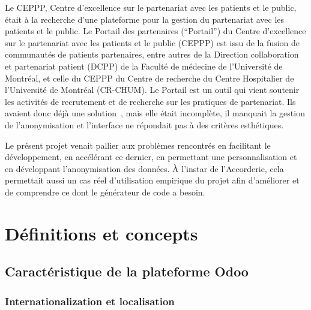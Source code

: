 


Le CEPPP, Centre d’excellence sur le partenariat avec les patients et le public, était à la recherche d'une plateforme pour la gestion du partenariat avec les patients et le public. Le Portail des partenaires (“Portail”) du Centre d’excellence sur le partenariat avec les patients et le public (CEPPP) est issu de la fusion de communautés de patients partenaires, entre autres de la Direction collaboration et partenariat patient (DCPP) de la Faculté de médecine de l’Université de Montréal, et celle du CEPPP du Centre de recherche du Centre Hospitalier de l’Université de Montréal (CR-CHUM). Le Portail est un outil qui vient soutenir les activités de recrutement et de recherche sur les pratiques de partenariat. Ils avaient donc déjà une solution~\cite{github_ceppp_crm}, mais elle était incomplète, il manquait la gestion de l'anonymisation et l'interface ne répondait pas à des critères esthétiques.

Le présent projet venait pallier aux problèmes rencontrés en facilitant le développement, en accélérant ce dernier, en permettant une personnalisation et en développant l'anonymisation des données. À l'instar de l'Accorderie, cela permettait aussi un cas réel d'utilisation empirique du projet afin d'améliorer et de comprendre ce dont le générateur de code a besoin. 




\section{Définitions et concepts}

\subsection{Caractéristique de la plateforme Odoo}


\subsubsection{Internationalization et localisation}

